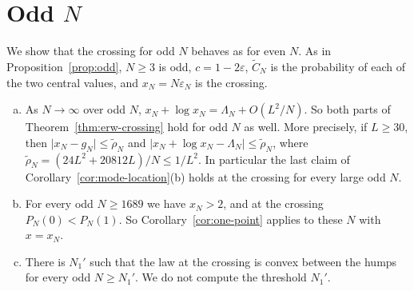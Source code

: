\section{Odd \texorpdfstring{$N$}{N}}\label{or:odd}

We show that the crossing for odd $N$ behaves as for even $N$. As in
Proposition~\ref{prop:odd}, $N\ge3$ is odd, $c=1-2\varepsilon$, $\widetilde C_N$ is the
probability of each of the two central values, and $x_N=N\varepsilon_N$ is the crossing.

\begin{proposition}\label{prop:odd-more}
\begin{enumerate}[(a)]
\item As $N\to\infty$ over odd $N$, $x_N+\log x_N=\Lambda_N+O(L^2/N)$. So both parts of
Theorem~\ref{thm:erw-crossing} hold for odd $N$ as well. More precisely, if $L\ge30$, then
$\lvert x_N-g_N\rvert\le\tilde\rho_N$ and $\lvert x_N+\log x_N-\Lambda_N\rvert\le\tilde\rho_N$,
where $\tilde\rho_N=(24L^2+20812L)/N\le1/L^2$. In particular the last claim of
Corollary~\ref{cor:mode-location}(b) holds at the crossing for every large odd $N$.
\item For every odd $N\ge1689$ we have $x_N>2$, and at the crossing $P_N(0)<P_N(1)$. So
Corollary~\ref{cor:one-point} applies to these $N$ with $x=x_N$.
\item There is $N_1'$ such that the law at the crossing is convex between the humps for
every odd $N\ge N_1'$. We do not compute the threshold $N_1'$.
\end{enumerate}
\end{proposition}

